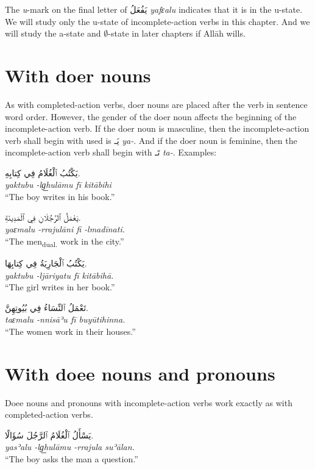 \documentclass[
  10pt,
]{book}
\begin{document}
The \emph{u}-mark on the final letter of \foreignlanguage{arabic}{يَفُعَلُ} \emph{yafɛalu} indicates that it is in the u-state. We will study only the u-state of incomplete-action verbs in this chapter. And we will study the a-state and \(\emptyset\)-state in later chapters if Allāh wills.

\section{With doer nouns}\label{with-doer-nouns}

As with completed-action verbs, doer nouns are placed after the verb in sentence word order. However, the gender of the doer noun affects the beginning of the incomplete-action verb. If the doer noun is masculine, then the incomplete-action verb shall begin with used is \foreignlanguage{arabic}{يَـ} \emph{ya-}. And if the doer noun is feminine, then the incomplete-action verb shall begin with \foreignlanguage{arabic}{تَـ} \emph{ta-}. Examples:

\foreignlanguage{arabic}{يَکْتُبُ ٱلْغُلَامُ فِي کِتابِهِ.}\\
\emph{yaktubu -lg͟hulāmu fī kitābihi}\\
\enquote{The boy writes in his book.}

\foreignlanguage{arabic}{يَعْمَلُ ٱلرَّجُلَانِ فِي ٱلْمَدِينَةِ.}\\
\emph{yaɛmalu -rrajulāni fi -lmadīnati.}\\
\enquote{The men\textsubscript{dual.} work in the city.}

\foreignlanguage{arabic}{يَکْتُبُ ٱلْجَارِيَةُ فِي کِتابِهَا.}\\
\emph{yaktubu -ljāriyatu fī kitābihā.}\\
\enquote{The girl writes in her book.}

\foreignlanguage{arabic}{تَعْمَلُ ٱلنِّسَاءُ فِي بُيُوتِهِنَّ.}\\
\emph{taɛmalu -nnisāʾu fī buyūtihinna.}\\
\enquote{The women work in their houses.}

\section{With doee nouns and pronouns}\label{with-doee-nouns-and-pronouns}

Doee nouns and pronouns with incomplete-action verbs work exactly as with completed-action verbs.

\foreignlanguage{arabic}{يَسْأَلُ ٱلْغُلَامُ ٱلرَّجُلَ سُؤَالًا.}\\
\emph{yasʾalu -lg͟hulāmu -rrajula suʾālan.}\\
\enquote{The boy asks the man a question.}
\end{document}
